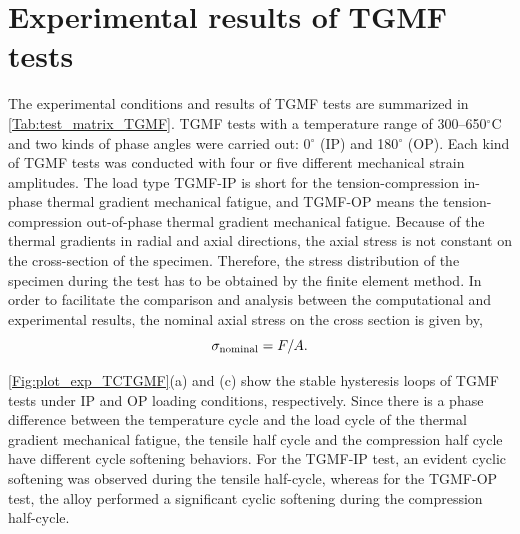 \documentclass[preprint,5p,twocolumn,11pt,sort&compress]{elsarticle}
\begin{document}

\section{Experimental results of TGMF tests}

The experimental conditions and results of TGMF tests are summarized in  \autoref{Tab:test_matrix_TGMF}. TGMF tests with a temperature range of 300–650$^\circ$C and two kinds of phase angles were carried out: 0$^\circ$ (IP) and 180$^\circ$ (OP). Each kind of TGMF tests was conducted with four or five different mechanical strain amplitudes. The load type TGMF-IP is short for the tension-compression in-phase thermal gradient mechanical fatigue, and TGMF-OP means the tension-compression out-of-phase thermal gradient mechanical fatigue. 
Because of the thermal gradients in radial and axial directions, the axial stress is not constant on the cross-section of the specimen.
Therefore, the stress distribution of the specimen during the test has to be obtained by the finite element method.
In order to facilitate the comparison and analysis between the computational and experimental results, the nominal axial stress on the cross section is given by,
\[\sigma_{\rm{nominal}} = F/A.\]

\autoref{Fig:plot_exp_TCTGMF}(a) and (c) show the stable hysteresis loops of TGMF tests under IP and OP loading conditions, respectively.
Since there is a phase difference between the temperature cycle and the load cycle of the thermal gradient mechanical fatigue, the tensile half cycle and the compression half cycle have different cycle softening behaviors.
For the TGMF-IP test, an evident cyclic softening was observed during the tensile half-cycle, whereas for the TGMF-OP test, the alloy performed a significant cyclic softening during the compression half-cycle.
\end{document}
